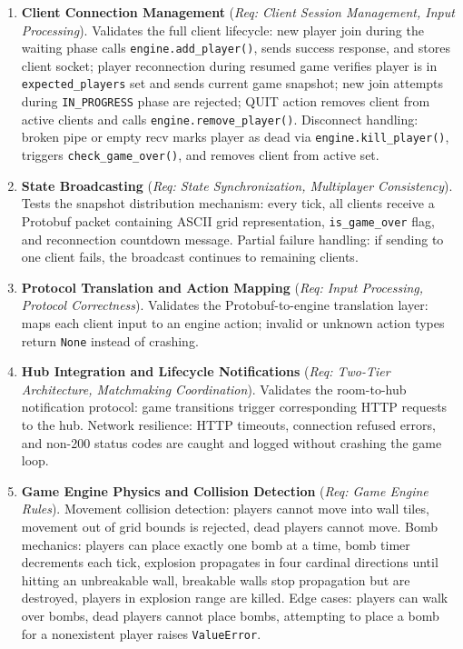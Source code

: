 \begin{enumerate}
    \item \textbf{Client Connection Management} (\textit{Req: Client Session Management, Input Processing}).
          Validates the full client lifecycle: new player join during the waiting phase calls \texttt{engine.add\_player()}, sends success response, and stores client socket; player reconnection during resumed game verifies player is in \texttt{expected\_players} set and sends current game snapshot; new join attempts during \texttt{IN\_PROGRESS} phase are rejected; QUIT action removes client from active clients and calls \texttt{engine.remove\_player()}.
          Disconnect handling: broken pipe or empty recv marks player as dead via \texttt{engine.kill\_player()}, triggers \texttt{check\_game\_over()}, and removes client from active set.

    \item \textbf{State Broadcasting} (\textit{Req: State Synchronization, Multiplayer Consistency}).
          Tests the snapshot distribution mechanism: every tick, all clients receive a Protobuf packet containing ASCII grid representation, \texttt{is\_game\_over} flag, and reconnection countdown message.
          Partial failure handling: if sending to one client fails, the broadcast continues to remaining clients.

    \item \textbf{Protocol Translation and Action Mapping} (\textit{Req: Input Processing, Protocol Correctness}).
          Validates the Protobuf-to-engine translation layer: maps each client input to an engine action; invalid or unknown action types return \texttt{None} instead of crashing.

    \item \textbf{Hub Integration and Lifecycle Notifications} (\textit{Req: Two-Tier Architecture, Matchmaking Coordination}).
          Validates the room-to-hub notification protocol: game transitions trigger corresponding HTTP requests to the hub.
          Network resilience: HTTP timeouts, connection refused errors, and non-200 status codes are caught and logged without crashing the game loop.

    \item \textbf{Game Engine Physics and Collision Detection} (\textit{Req: Game Engine Rules}).
          Movement collision detection: players cannot move into wall tiles, movement out of grid bounds is rejected, dead players cannot move.
          Bomb mechanics: players can place exactly one bomb at a time, bomb timer decrements each tick, explosion propagates in four cardinal directions until hitting an unbreakable wall, breakable walls stop propagation but are destroyed, players in explosion range are killed.
          Edge cases: players can walk over bombs, dead players cannot place bombs, attempting to place a bomb for a nonexistent player raises \texttt{ValueError}.


\end{enumerate}
